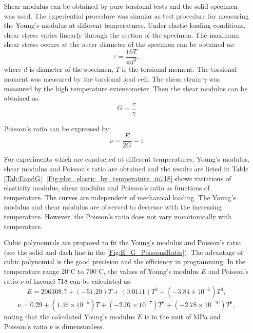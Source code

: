 Shear modulus can be obtained by pure torsional tests and the solid specimen was used.
The experiential procedure was simular as test procedure for measuring the Young's modulus at different temperatures.
Under elastic loading conditions, shear stress varies linearly through the section of the specimen.
The maximum shear stress occurs at the outer diameter of the specimen can be obtained as:
\begin{equation}
\tau=\frac{{16T}}{\pi d^3},
\end{equation}
where $d$ is diameter of the specimen, $T$ is the torsional moment.
The torsional moment was measured by the torsional load cell.
The shear strain $\gamma$ was measured by the high temperature extensometer.
Then the shear modulus can be obtained as:
\begin{equation}
G=\frac{\tau}{\gamma}
\end{equation}

Poisson's ratio can be expressed by:
\begin{equation}
\nu  = \frac{E}{{2G}} - 1
\end{equation}

For experiments which are conducted at different temperatures, Young's modulus, shear modulus and Poisson's ratio are obtained and the results are listed in Table \ref{Tab:EandG}.
\ref{Fig:plot_elastic_by_temperature_in718} shows variations of elasticity modulus, shear modulus and Poisson's ratio as functions of temperature. The curves are independent of mechanical loading. The Young's modulus and shear modulus are observed to decrease with the increasing temperature. However, the Poisson's ratio does not vary monotonically with temperature.

Cubic polynomials are proposed to fit the Young's modulus and Poisson's ratio (see the solid and dash line in the \ref{Fig:E_G_PoissonsRatio}).
The advantage of cubic polynomial is the good precision and the efficiency in programming.
In the temperature range 20$^{\circ}$C to 700$^{\circ}$C, the values of Young's modulus $E$ and Poisson's ratio $\nu$ of Inconel 718 can be calculated as:
\begin{equation}
E=206308.7+(-51.20)T+(0.0111)T^2+(-3.84\times10^{-5})T^3,
\end{equation}
\begin{equation}
\nu=0.29+(1.46\times10^{-5})T+(-2.07\times10^{-7})T^2+(-2.78\times10^{-10})T^3,
\end{equation}
noting that the calculated Young's modulus $E$ is in the unit of MPa and Poisson's ratio $\nu$ is dimensionless.

